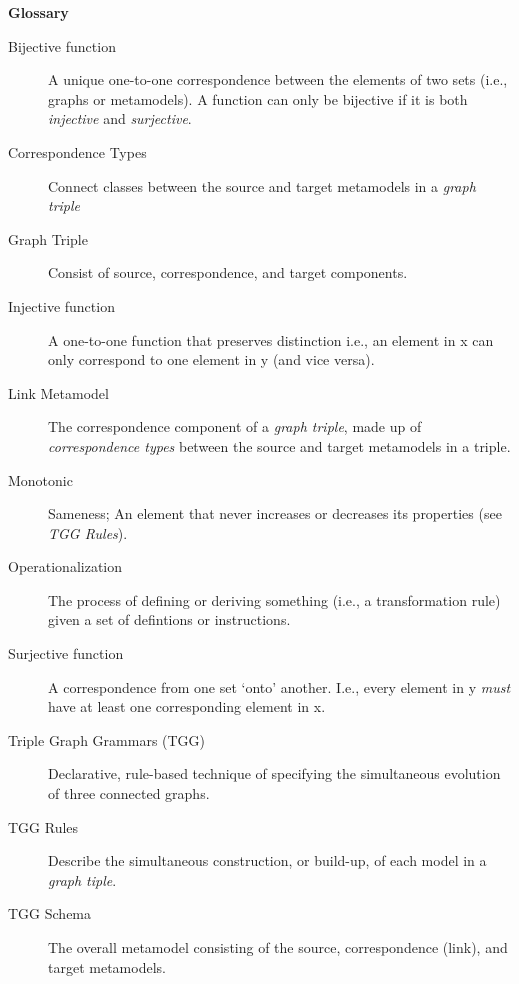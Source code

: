 \newpage
{}
{}
\hypertarget{glossary}{}

\vspace{1cm}
{\Huge \bf Glossary}
\vspace{1cm}

\begin{description}

\item[Bijective function] A unique one-to-one  correspondence between the elements of two sets (i.e., graphs or metamodels). A function can only be bijective if
it is both \emph{injective} and \emph{surjective}.

\item[Correspondence Types] Connect classes between the source and target metamodels in a \emph{graph triple}

\item[Graph Triple] Consist of source, correspondence, and target components.

\item[Injective function] A one-to-one function that preserves distinction i.e., an element in x can only correspond to one element in y (and vice versa).

\item[Link Metamodel] The correspondence component of a \emph{graph triple}, made up of \emph{correspondence types} between the source and target metamodels in
a triple.

\item[Monotonic] Sameness; An element that never increases or decreases its properties (see \emph{TGG Rules}).

\item[Operationalization] The process of defining or deriving something (i.e., a transformation rule) given a set of defintions or instructions.

\item[Surjective function] A correspondence from one set `onto' another. I.e., every element in y \emph{must} have at least one corresponding element in x.

\item[Triple Graph Grammars (TGG)] Declarative, rule-based technique of specifying the simultaneous evolution of three connected graphs.

\item[TGG Rules] Describe the simultaneous construction, or build-up, of each model in a \emph{graph tiple}.

\item[TGG Schema] The overall metamodel consisting of the source, correspondence (link), and target metamodels.

\end{description}